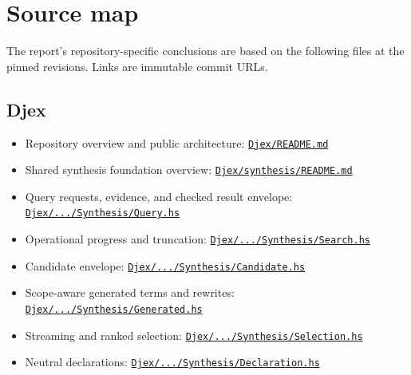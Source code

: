 \documentclass[11pt,oneside]{article}
\newcommand{\sourcelink}[2]{\href{#1}{\nolinkurl{#2}}}
\begin{document}
\section{Source map}
\label{app:sources}

The report's repository-specific conclusions are based on the following files at the
pinned revisions. Links are immutable commit URLs.

\subsection*{Djex}

\begin{itemize}
  \item Repository overview and public architecture:
  \sourcelink{https://github.com/VladimirReshetnikov/Djex/blob/f50b5eac86726c7530d95e48c27101b7c0fa25c9/README.md}{Djex/README.md}
  \item Shared synthesis foundation overview:
  \sourcelink{https://github.com/VladimirReshetnikov/Djex/blob/f50b5eac86726c7530d95e48c27101b7c0fa25c9/synthesis/README.md}{Djex/synthesis/README.md}
  \item Query requests, evidence, and checked result envelope:
  \sourcelink{https://github.com/VladimirReshetnikov/Djex/blob/f50b5eac86726c7530d95e48c27101b7c0fa25c9/synthesis/src/Language/Haskell/Synthesis/Query.hs}{Djex/.../Synthesis/Query.hs}
  \item Operational progress and truncation:
  \sourcelink{https://github.com/VladimirReshetnikov/Djex/blob/f50b5eac86726c7530d95e48c27101b7c0fa25c9/synthesis/src/Language/Haskell/Synthesis/Search.hs}{Djex/.../Synthesis/Search.hs}
  \item Candidate envelope:
  \sourcelink{https://github.com/VladimirReshetnikov/Djex/blob/f50b5eac86726c7530d95e48c27101b7c0fa25c9/synthesis/src/Language/Haskell/Synthesis/Candidate.hs}{Djex/.../Synthesis/Candidate.hs}
  \item Scope-aware generated terms and rewrites:
  \sourcelink{https://github.com/VladimirReshetnikov/Djex/blob/f50b5eac86726c7530d95e48c27101b7c0fa25c9/synthesis/src/Language/Haskell/Synthesis/Generated.hs}{Djex/.../Synthesis/Generated.hs}
  \item Streaming and ranked selection:
  \sourcelink{https://github.com/VladimirReshetnikov/Djex/blob/f50b5eac86726c7530d95e48c27101b7c0fa25c9/synthesis/src/Language/Haskell/Synthesis/Selection.hs}{Djex/.../Synthesis/Selection.hs}
  \item Neutral declarations:
  \sourcelink{https://github.com/VladimirReshetnikov/Djex/blob/f50b5eac86726c7530d95e48c27101b7c0fa25c9/synthesis/src/Language/Haskell/Synthesis/Declaration.hs}{Djex/.../Synthesis/Declaration.hs}

\end{itemize}
\end{document}
